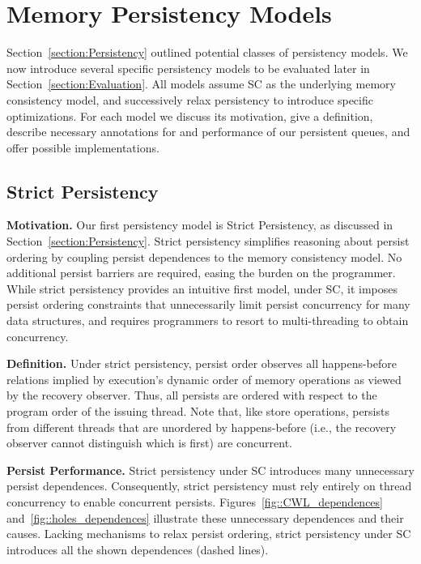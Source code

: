 \section{Memory Persistency Models}
\label{sec:PersistencyModels:Models}

Section~\ref{section:Persistency} outlined potential classes of persistency models.
We now introduce several specific persistency models to be evaluated later in Section~\ref{section:Evaluation}.
All models assume SC as the underlying memory consistency model, and successively relax persistency to introduce specific optimizations.
For each model we discuss its motivation, give a definition, describe necessary annotations for and performance of our persistent queues, and offer possible implementations.

\subsection{Strict Persistency}
\label{section:PersistencyModels:Strict}

\textbf{Motivation.}
Our first persistency model is Strict Persistency, as discussed in Section~\ref{section:Persistency}.
Strict persistency simplifies reasoning about persist ordering by coupling persist dependences to the memory consistency model.
No additional persist barriers are required, easing the burden on the programmer.
While strict persistency provides an intuitive first model, under SC, it imposes persist ordering constraints that unnecessarily limit persist concurrency for many data structures, and requires programmers to resort to multi-threading to obtain concurrency.

\textbf{Definition.}
Under strict persistency, persist order observes all happens-before relations implied by execution's dynamic order of memory operations as viewed by the recovery observer.
Thus, all persists are ordered with respect to the program order of the issuing thread.
Note that, like store operations, persists from different threads that are unordered by happens-before (i.e., the recovery observer cannot distinguish which is first) are concurrent.

\textbf{Persist Performance.}
Strict persistency under SC introduces many unnecessary persist dependences.
Consequently, strict persistency must rely entirely on thread concurrency to enable concurrent persists.
Figures~\ref{fig::CWL_dependences} and~\ref{fig::holes_dependences} illustrate these unnecessary dependences and their causes.
Lacking mechanisms to relax persist ordering, strict persistency under SC introduces all the shown dependences (dashed lines).

